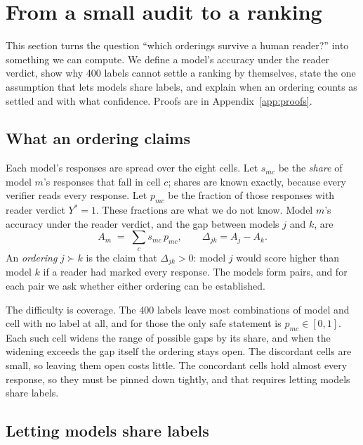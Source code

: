 \section{From a small audit to a ranking}
\label{sec:setup}

This section turns the question ``which orderings survive a human reader?'' into something we can
compute. We define a model's accuracy under the reader verdict, show why 400 labels cannot settle
a ranking by themselves, state the one assumption that lets models share labels, and explain when
an ordering counts as settled and with what confidence. Proofs are in Appendix~\ref{app:proofs}.

\subsection{What an ordering claims}

Each model's responses are spread over the eight cells. Let $s_{mc}$ be the \emph{share} of model
$m$'s responses that fall in cell $c$; shares are known exactly, because every verifier reads every
response. Let $p_{mc}$ be the fraction of those responses with reader verdict $Y^* = 1$. These
fractions are what we do not know. Model $m$'s accuracy under the reader verdict, and the gap
between models $j$ and $k$, are
\begin{equation}
A_m \;=\; \sum_{c} s_{mc}\, p_{mc}, \qquad \Delta_{jk} = A_j - A_k .
\label{eq:accuracy}
\end{equation}
An \emph{ordering} $j \succ k$ is the claim that $\Delta_{jk} > 0$: model $j$ would score higher
than model $k$ if a reader had marked every response. The \NumModels{} models form
\NumOrderings{} pairs, and for each pair we ask whether either ordering can be established.

The difficulty is coverage. The 400 labels leave most combinations of model and cell with no label
at all, and for those the only safe statement is $p_{mc} \in [0,1]$. Each such cell widens the range
of possible gaps by its share, and when the widening exceeds the gap itself the ordering stays open.
The discordant cells are small, so leaving them open costs little. The concordant cells hold almost
every response, so they must be pinned down tightly, and that requires letting models share labels.

\subsection{Letting models share labels}

